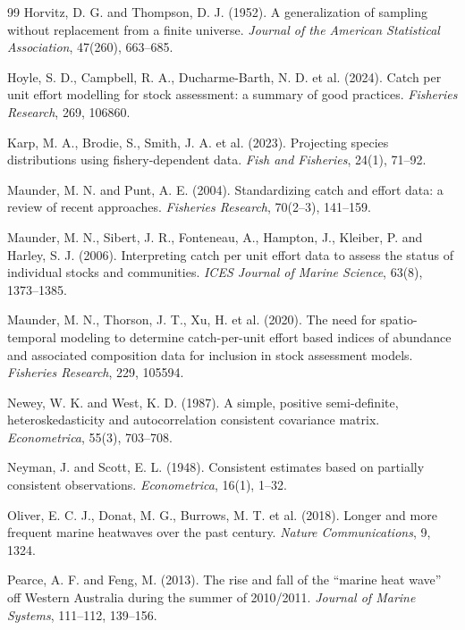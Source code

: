 \documentclass[11pt,a4paper]{article}
\begin{document}
\begin{thebibliography}{99}
Horvitz, D. G. and Thompson, D. J. (1952). A generalization of sampling without replacement from a finite universe. \textit{Journal of the American Statistical Association}, 47(260), 663--685.

Hoyle, S. D., Campbell, R. A., Ducharme-Barth, N. D. et al. (2024). Catch per unit effort modelling for stock assessment: a summary of good practices. \textit{Fisheries Research}, 269, 106860.

Karp, M. A., Brodie, S., Smith, J. A. et al. (2023). Projecting species distributions using fishery-dependent data. \textit{Fish and Fisheries}, 24(1), 71--92.

Maunder, M. N. and Punt, A. E. (2004). Standardizing catch and effort data: a review of recent approaches. \textit{Fisheries Research}, 70(2--3), 141--159.

Maunder, M. N., Sibert, J. R., Fonteneau, A., Hampton, J., Kleiber, P. and Harley, S. J. (2006). Interpreting catch per unit effort data to assess the status of individual stocks and communities. \textit{ICES Journal of Marine Science}, 63(8), 1373--1385.

Maunder, M. N., Thorson, J. T., Xu, H. et al. (2020). The need for spatio-temporal modeling to determine catch-per-unit effort based indices of abundance and associated composition data for inclusion in stock assessment models. \textit{Fisheries Research}, 229, 105594.

Newey, W. K. and West, K. D. (1987). A simple, positive semi-definite, heteroskedasticity and autocorrelation consistent covariance matrix. \textit{Econometrica}, 55(3), 703--708.

Neyman, J. and Scott, E. L. (1948). Consistent estimates based on partially consistent observations. \textit{Econometrica}, 16(1), 1--32.

Oliver, E. C. J., Donat, M. G., Burrows, M. T. et al. (2018). Longer and more frequent marine heatwaves over the past century. \textit{Nature Communications}, 9, 1324.

Pearce, A. F. and Feng, M. (2013). The rise and fall of the ``marine heat wave'' off Western Australia during the summer of 2010/2011. \textit{Journal of Marine Systems}, 111--112, 139--156.


\end{thebibliography}
\end{document}
